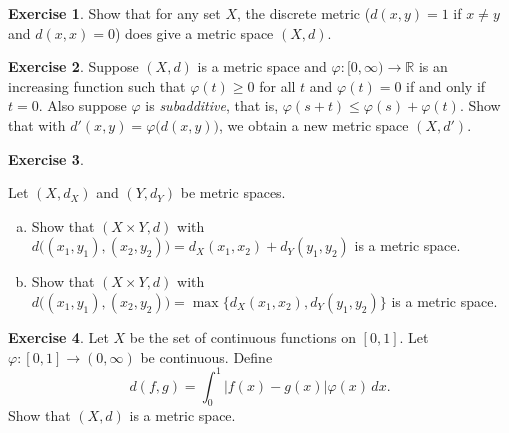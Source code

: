 \documentclass[12pt,openany]{book}
\newcommand{\abs}[1]{\left\lvert {#1} \right\rvert}
\newcommand{\R}{{\mathbb{R}}}
\newcommand{\myindex}[1]{#1\index{#1}}
\theoremstyle{plain}
\theoremstyle{remark}
\theoremstyle{definition}
\newenvironment{exbox}{%
    \def\FrameCommand{\vrule width 1pt \relax\hspace {10pt}}%
    \MakeFramed {\advance \hsize -\width \FrameRestore }%
}{%
    \endMakeFramed
}
\newenvironment{exparts}{%
    \leavevmode\begin{enumerate}[a),noitemsep,topsep=0pt,parsep=0pt,partopsep=0pt]
}{%
    \end{enumerate}
}
\theoremstyle{exercise}
\newtheorem{exercise}{Exercise}[section]
\theoremstyle{example}
\begin{document}
\begin{exbox}
\begin{exercise}
Show that for any set $X$, the discrete metric ($d(x,y) = 1$ if $x\not=y$ and
$d(x,x) = 0$) does give a metric space $(X,d)$.
\end{exercise}

\begin{exercise}
Suppose $(X,d)$ is a metric space and
$\varphi \colon [0,\infty) \to \R$ is
an increasing function such that 
$\varphi(t) \geq 0$ for all $t$ and $\varphi(t) = 0$ if and only if
$t=0$.  Also suppose $\varphi$ is \emph{\myindex{subadditive}},
that is, $\varphi(s+t) \leq \varphi(s)+\varphi(t)$.
Show that with $d'(x,y) = \varphi\bigl(d(x,y)\bigr)$, we obtain a new
metric space $(X,d')$.
\end{exercise}

\begin{exercise} \label{exercise:mscross}
\begin{samepage}
Let $(X,d_X)$ and $(Y,d_Y)$ be metric spaces.
\begin{exparts}
\item
Show that $(X \times Y,d)$ with
$d\bigl( (x_1,y_1), (x_2,y_2) \bigr) = d_X(x_1,x_2) + d_Y(y_1,y_2)$ is
a metric space.
\item
Show that $(X \times Y,d)$ with
$d\bigl( (x_1,y_1), (x_2,y_2) \bigr) = \max \{ d_X(x_1,x_2) , d_Y(y_1,y_2) \}$ is
a metric space.
\end{exparts}
\end{samepage}
\end{exercise}

\begin{exercise}
Let $X$ be the set of continuous functions on $[0,1]$.  Let $\varphi \colon
[0,1] \to (0,\infty)$ be continuous.  Define
\begin{equation*}
d(f,g) = \int_0^1 \abs{f(x)-g(x)}\varphi(x)\,dx .
\end{equation*}
Show that $(X,d)$ is a metric space.
\end{exercise}


\end{exbox}
\end{document}
